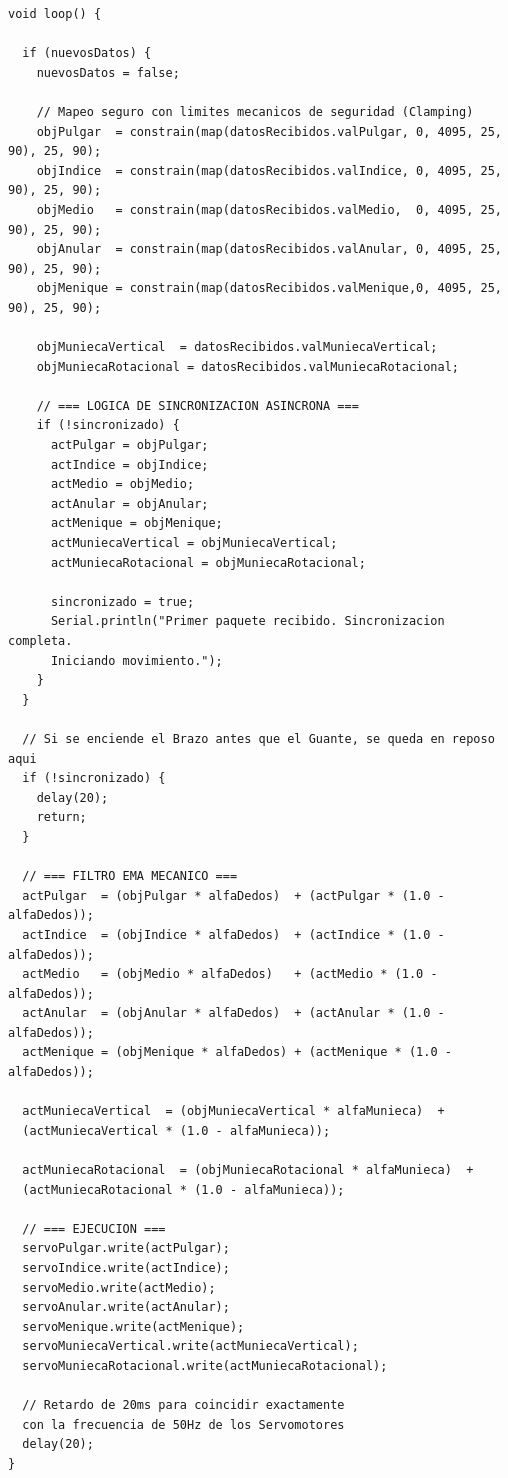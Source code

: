 \documentclass[10pt]{article}
\begin{document}
\begin{lstlisting}
void loop() {
  
  if (nuevosDatos) {
    nuevosDatos = false;
    
    // Mapeo seguro con limites mecanicos de seguridad (Clamping)
    objPulgar  = constrain(map(datosRecibidos.valPulgar, 0, 4095, 25, 90), 25, 90);
    objIndice  = constrain(map(datosRecibidos.valIndice, 0, 4095, 25, 90), 25, 90);
    objMedio   = constrain(map(datosRecibidos.valMedio,  0, 4095, 25, 90), 25, 90);
    objAnular  = constrain(map(datosRecibidos.valAnular, 0, 4095, 25, 90), 25, 90);
    objMenique = constrain(map(datosRecibidos.valMenique,0, 4095, 25, 90), 25, 90);
    
    objMuniecaVertical  = datosRecibidos.valMuniecaVertical;
    objMuniecaRotacional = datosRecibidos.valMuniecaRotacional;

    // === LOGICA DE SINCRONIZACION ASINCRONA ===
    if (!sincronizado) {
      actPulgar = objPulgar;
      actIndice = objIndice;
      actMedio = objMedio;
      actAnular = objAnular;
      actMenique = objMenique;
      actMuniecaVertical = objMuniecaVertical;
      actMuniecaRotacional = objMuniecaRotacional;
      
      sincronizado = true;
      Serial.println("Primer paquete recibido. Sincronizacion completa. 
      Iniciando movimiento.");
    }
  }

  // Si se enciende el Brazo antes que el Guante, se queda en reposo aqui
  if (!sincronizado) {
    delay(20);
    return; 
  }

  // === FILTRO EMA MECANICO ===
  actPulgar  = (objPulgar * alfaDedos)  + (actPulgar * (1.0 - alfaDedos));
  actIndice  = (objIndice * alfaDedos)  + (actIndice * (1.0 - alfaDedos));
  actMedio   = (objMedio * alfaDedos)   + (actMedio * (1.0 - alfaDedos));
  actAnular  = (objAnular * alfaDedos)  + (actAnular * (1.0 - alfaDedos));
  actMenique = (objMenique * alfaDedos) + (actMenique * (1.0 - alfaDedos));
  
  actMuniecaVertical  = (objMuniecaVertical * alfaMunieca)  + 
  (actMuniecaVertical * (1.0 - alfaMunieca));
  
  actMuniecaRotacional  = (objMuniecaRotacional * alfaMunieca)  + 
  (actMuniecaRotacional * (1.0 - alfaMunieca));

  // === EJECUCION ===
  servoPulgar.write(actPulgar);
  servoIndice.write(actIndice);
  servoMedio.write(actMedio);
  servoAnular.write(actAnular);
  servoMenique.write(actMenique);
  servoMuniecaVertical.write(actMuniecaVertical);
  servoMuniecaRotacional.write(actMuniecaRotacional);

  // Retardo de 20ms para coincidir exactamente 
  con la frecuencia de 50Hz de los Servomotores
  delay(20); 
}
\end{lstlisting}
\end{document}
